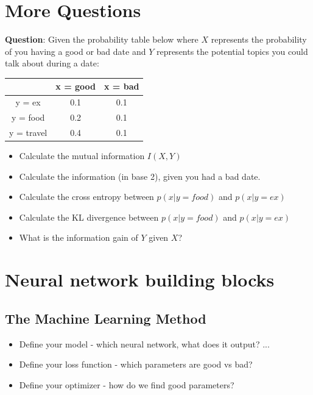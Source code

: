 \documentclass{article}
\begin{document}
\section{More Questions}
\textbf{Question}: Given the probability table below where $X$ represents the probability of you having a good or bad date and $Y$ represents the potential topics you could talk about during a date: \\ 
\begin{center}
\begin{tabular}{ c| c c }
       & x = good & x = bad \\ 
 \hline
 y = ex & 0.1 & 0.1 \\  
 y = food & 0.2 & 0.1 \\    
 y = travel & 0.4 & 0.1 \\
 \hline
\end{tabular}
\end{center}
\begin{itemize}
    \item Calculate the mutual information $I(X,Y)$
    \item Calculate the information (in base 2), given you had a bad date.
    \item Calculate the cross entropy between $p(x|y =  food)$ and $p(x|y = ex)$
    \item Calculate the KL divergence between $p(x|y = food)$ and $p(x|y = ex)$
    \item What is the information gain of $Y$ given $X$? 
\end{itemize}

\section{Neural network building blocks}

\subsection{The Machine Learning Method}
\begin{itemize}
    \item Define your model - which neural network, what does it output? ...
    \item Define your loss function - which parameters are good vs bad?
    \item Define your optimizer - how do we find good parameters?
\end{itemize}
\end{document}
